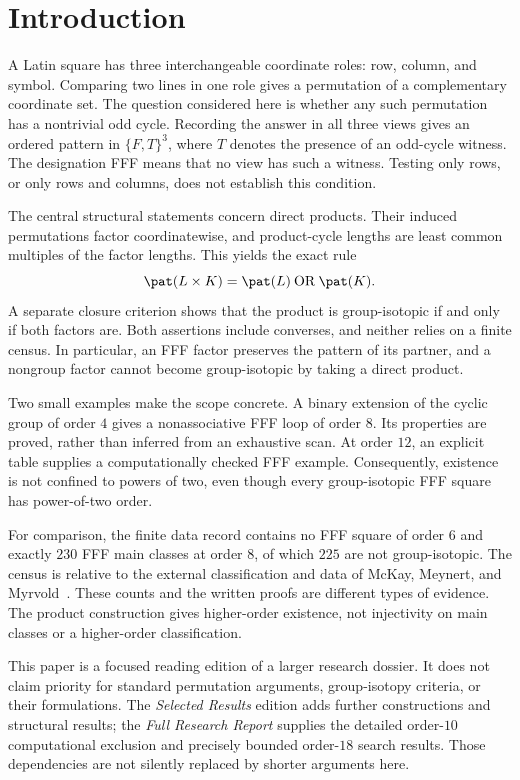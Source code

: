 \section{Introduction}

A Latin square has three interchangeable coordinate roles: row, column,
and symbol. Comparing two lines in one role gives a permutation of a
complementary coordinate set. The question considered here is whether any
such permutation has a nontrivial odd cycle. Recording the answer in all
three views gives an ordered pattern in $\{F,T\}^3$, where $T$ denotes the
presence of an odd-cycle witness. The designation FFF means that no view
has such a witness. Testing only rows, or only rows and columns, does not
establish this condition.

The central structural statements concern direct products. Their induced
permutations factor coordinatewise, and product-cycle lengths are least
common multiples of the factor lengths. This yields the exact rule
\[
 \pat(L\times K)=\pat(L)\mathbin{\mathrm{OR}}\pat(K).
\]
A separate closure criterion shows that the product is group-isotopic
if and only if both factors are. Both assertions include converses, and
neither relies on a finite census. In particular, an FFF factor preserves
the pattern of its partner, and a nongroup factor cannot become
group-isotopic by taking a direct product.

Two small examples make the scope concrete. A binary extension of the
cyclic group of order $4$ gives a nonassociative FFF loop of order $8$.
Its properties are proved, rather than inferred from an exhaustive scan.
At order $12$, an explicit table supplies a computationally checked FFF
example. Consequently, existence is not confined to powers of two, even
though every group-isotopic FFF square has power-of-two order.

For comparison, the finite data record contains no FFF square of order $6$
and exactly $230$ FFF main classes at order $8$, of which $225$ are not
group-isotopic. The census is relative to the external classification and
data of McKay, Meynert, and Myrvold~\cite{McKayMeynertMyrvold2007,McKayLatinData}.
These counts and the written proofs are different types of evidence.
The product construction gives higher-order existence, not injectivity on
main classes or a higher-order classification.

This paper is a focused reading edition of a larger research dossier.
It does not claim priority for standard permutation arguments, group-isotopy
criteria, or their formulations. The \emph{Selected Results} edition adds
further constructions and structural results; the \emph{Full Research
Report} supplies the detailed order-$10$ computational exclusion and
precisely bounded order-$18$ search results. Those dependencies are not
silently replaced by shorter arguments here.
